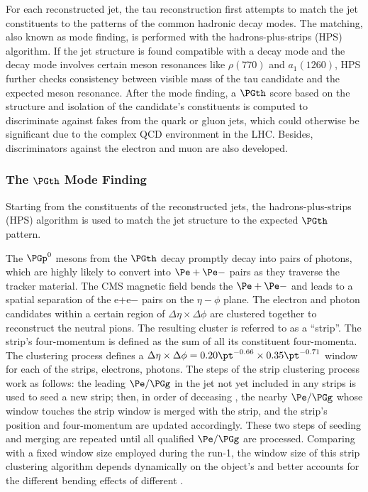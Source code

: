 For each reconstructed jet, the tau reconstruction first attempts to match the jet constituents to the patterns of the common hadronic decay modes. The matching, also known as mode finding, is performed with the hadrons-plus-strips (HPS) algorithm. If the jet structure is found compatible with a decay mode and the decay mode involves certain meson resonances like $\rho(770)$ and $a_1(1260)$, HPS further checks consistency between visible mass of the tau candidate and the expected meson resonance. After the mode finding, a $\PGth$ score based on the structure and isolation of the candidate's constituents is computed to discriminate against fakes from the quark or gluon jets, which could otherwise be significant due to the complex QCD environment in the LHC. Besides, discriminators against the electron and muon are also developed.


\subsubsection{The $\PGth$ Mode Finding}

Starting from the constituents of the reconstructed jets, the hadrons-plus-strips (HPS) algorithm is used to match the jet structure to the expected $\PGth$ pattern. 

The $\PGp^0$ mesons from the $\PGth$ decay promptly decay into pairs of photons, which are highly likely to convert into $ \Pe+ \Pe-$ pairs as they traverse the tracker material. The CMS magnetic field bends the $ \Pe+ \Pe-$ and leads to a spatial separation of the e+e− pairs on the $\eta-\phi$ plane. The electron and photon candidates within a certain region of $\Delta\eta \times \Delta \phi$  are clustered together to reconstruct the neutral pions. The resulting cluster is referred to as a “strip”. The strip's four-momentum is defined as the sum of all its constituent four-momenta. The clustering process defines a $\Delta\eta \times \Delta \phi = 0.20\pt^{-0.66} \times 0.35 \pt^{-0.71}$ window for each of the strips, electrons, photons. The steps of the strip clustering process work as follows: the leading $ \Pe/\PGg$ in the jet not yet included in any strips is used to seed a new strip; then, in order of deceasing \pt, the nearby $ \Pe/\PGg$ whose window touches the strip window is merged with the strip, and the strip's position and four-momentum are updated accordingly. These two steps of seeding and merging are repeated until all qualified $ \Pe/\PGg$ are processed. Comparing with a fixed window size employed during the run-1, the window size of this strip clustering algorithm depends dynamically on the object's \pt and better accounts for the different bending effects of different \pt.

